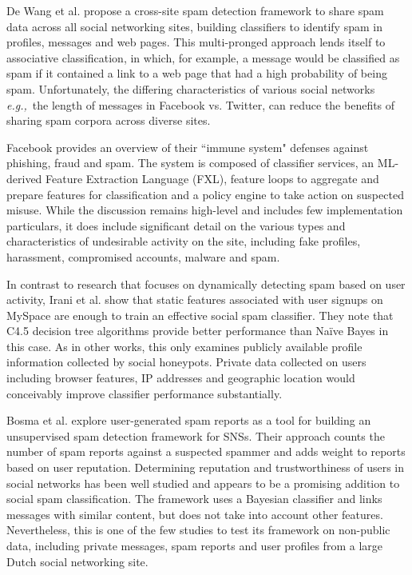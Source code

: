 \documentclass[preprint]{acm_proc_article-sp}
\newcommand{\eg}{{\em e.g.,}~}
\begin{document}
De Wang et al. \cite{wang} propose a cross-site spam detection framework to share 
spam data across all social networking sites, building classifiers to identify spam 
in profiles, messages and web pages. This multi-pronged approach lends itself to 
associative classification, in which, for example, a message would be classified as 
spam if it contained a link to a web page that had a high probability of being spam. 
Unfortunately, the differing characteristics of various social networks \eg the length 
of messages in Facebook vs. Twitter, can reduce the benefits of sharing spam corpora 
across diverse sites.

Facebook \cite{stein} provides an overview of their ``immune system" defenses 
against phishing, fraud and spam. The system is composed of classifier services, an 
ML-derived Feature Extraction Language (FXL), feature loops to aggregate and prepare 
features for classification and a policy engine to take action on suspected misuse. While 
the discussion remains high-level and includes few implementation particulars, it does 
include significant detail on the various types and characteristics of undesirable 
activity on the site, including fake profiles, harassment, compromised accounts, malware 
and spam. 

In contrast to research that focuses on dynamically detecting spam based on user 
activity, Irani et al. \cite{irani} show that static features associated with user signups 
on MySpace are enough to train an effective social spam classifier. They note that
C4.5 decision tree algorithms provide better performance than Na\"ive Bayes in this case. 
As in other works, this only examines publicly available profile information collected 
by social honeypots. Private data collected on users including browser features, IP addresses 
and geographic location would conceivably improve classifier performance substantially.

Bosma et al. \cite{bosma} explore user-generated spam reports as a tool for building an unsupervised 
spam detection framework for SNSs. Their approach counts the number of spam reports against a 
suspected spammer and adds weight to reports based on user reputation. Determining reputation 
and trustworthiness of users in social networks has been well studied \cite{bian, guha, zhang} 
and appears to be a promising addition to social spam classification. The framework uses a 
Bayesian classifier and links messages with similar content, but does not take into account 
other features. Nevertheless, this is one of the few studies to test its framework on 
non-public data, including private messages, spam reports and user profiles from a 
large Dutch social networking site.
\end{document}
